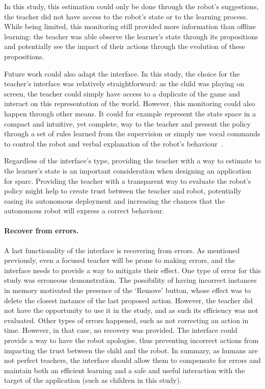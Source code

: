 In this study, this estimation could only be done through the robot's suggestions, the teacher did not have access to the robot's state or to the learning process. While being limited, this monitoring still provided more information than offline learning: the teacher was able observe the learner's state through its propositions and potentially see the impact of their actions through the evolution of these propositions.

Future work could also adapt the interface. In this study, the choice for the teacher's interface was relatively straightforward: as the child was playing on screen, the teacher could simply have access to a duplicate of the game and interact on this representation of the world. However, this monitoring could also happen through other means. It could for example represent the state space in a compact and intuitive, yet complete, way to the teacher and present the policy through a set of rules learned from the supervision or simply use vocal commands to control the robot and verbal explanation of the robot's behaviour~\citep{hayes2017improving}.

Regardless of the interface's type, providing the teacher with a way to estimate to the learner's state is an important consideration when designing an application for \gls{sparc}. Providing the teacher with a transparent way to evaluate the robot's policy might help to create trust between the teacher and robot, potentially easing its autonomous deployment and increasing the chances that the autonomous robot will express a correct behaviour.

\paragraph{Recover from errors.}

A last functionality of the interface is recovering from errors. As mentioned previously, even a focused teacher will be prone to making errors, and the interface needs to provide a way to mitigate their effect. One type of error for this study was erroneous demonstration. The possibility of having incorrect instances in memory motivated the presence of the `Remove' button, whose effect was to delete the closest instance of the last proposed action. However, the teacher did not have the opportunity to use it in the study, and as such its efficiency was not evaluated. Other types of errors happened, such as not correcting an action in time. However, in that case, no recovery was provided. The interface could provide a way to have the robot apologise, thus preventing incorrect actions from impacting the trust between the child and the robot. In summary, as humans are not perfect teachers, the interface should allow them to compensate for errors and maintain both an efficient learning and a safe and useful interaction with the target of the application (such as children in this study).

